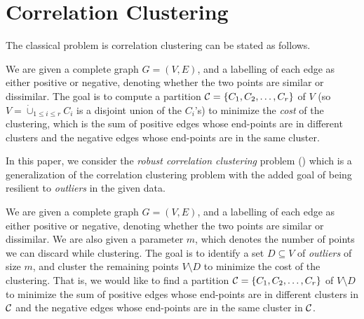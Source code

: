 \section{Correlation Clustering}

The classical problem is correlation clustering can be stated as follows.
\begin{problem} \label{prob:1}
We are given a complete graph $G = (V,E)$, and a labelling of each edge as either positive or negative, denoting whether the two points are similar or dissimilar. The goal is to compute a partition ${\cal C} = \{C_1, C_2, \ldots, C_r\}$ of $V$ (so $V = \dot\cup_{1 \leq i \leq r} C_i$ is a disjoint union of the $C_i$'s) to minimize the \emph{cost} of the clustering, which is the sum of positive edges whose end-points are in different clusters and the negative edges whose end-points are in the same cluster. 
\end{problem}

In this paper, we consider the \emph{robust correlation clustering} problem (\robcc) which is a generalization of the correlation clustering problem with the added goal of being resilient to \emph{outliers} in the given data. 

\begin{problem} \label{prob:2}
We are given a complete graph $G = (V,E)$, and a labelling of each edge as either positive or negative, denoting whether the two points are similar or dissimilar. We are also given a parameter $m$, which denotes the number of points we can discard while clustering. The goal is to identify a set $D \subseteq V$ of \emph{outliers} of size $m$, and cluster the remaining points $V\setminus D$ to minimize the cost of the clustering. That is, we would like to find a partition ${\cal C} = \{C_1, C_2, \ldots, C_r\}$ of $V \setminus D$ to minimize the sum of positive edges whose end-points are in different clusters in ${\cal C}$ and the negative edges whose end-points are in the same cluster in ${\cal C}$. 
\end{problem}


